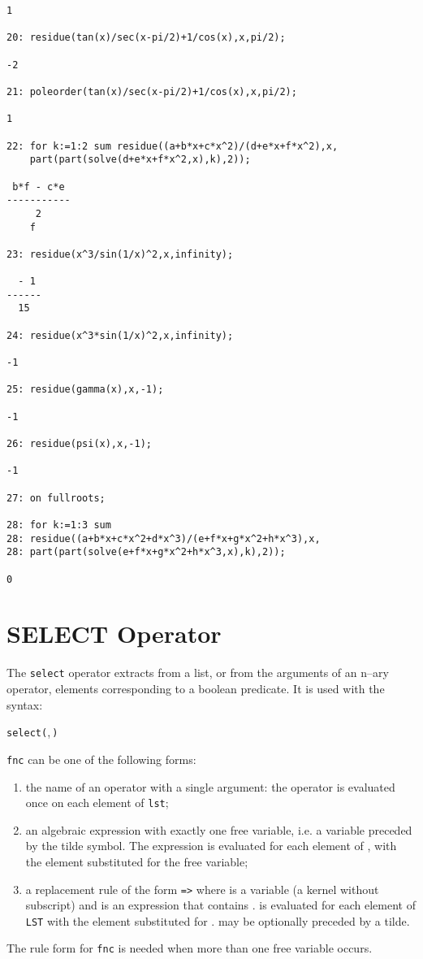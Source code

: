 \begin{small}
\begin{verbatim}
1

20: residue(tan(x)/sec(x-pi/2)+1/cos(x),x,pi/2);

-2

21: poleorder(tan(x)/sec(x-pi/2)+1/cos(x),x,pi/2);

1

22: for k:=1:2 sum residue((a+b*x+c*x^2)/(d+e*x+f*x^2),x,
    part(part(solve(d+e*x+f*x^2,x),k),2));

 b*f - c*e
-----------
     2
    f

23: residue(x^3/sin(1/x)^2,x,infinity);

  - 1
------
  15

24: residue(x^3*sin(1/x)^2,x,infinity);

-1

25: residue(gamma(x),x,-1);

-1

26: residue(psi(x),x,-1);

-1

27: on fullroots;

28: for k:=1:3 sum
28: residue((a+b*x+c*x^2+d*x^3)/(e+f*x+g*x^2+h*x^3),x,
28: part(part(solve(e+f*x+g*x^2+h*x^3,x),k),2));

0
\end{verbatim}
\end{small}

\section{SELECT Operator}
\hypertarget{operator:SELECT}{}

The \texttt{select} operator extracts from a list,
or from the arguments of an n--ary operator, elements corresponding
to a boolean predicate. It is used with the syntax:
\begin{syntax}
  \texttt{select(},\,\texttt{)}
\end{syntax}

\texttt{fnc} can be one of the following forms:
\begin{enumerate}
\item the name of an operator with a single argument: the operator
is evaluated once on each element of \texttt{lst};
\item an algebraic expression with exactly one free variable, i.e.
a variable preceded by the tilde symbol. The expression
is evaluated for each element of , with the element
substituted for the free variable;
\item a replacement rule of the form  \texttt{=>} 
where  is a variable (a kernel without subscript)
and  is an expression that contains .
 is evaluated for each element of \texttt{LST} with
the element substituted for  .  may be
optionally preceded by a tilde.
\end{enumerate}
The rule form  for \texttt{fnc} is needed when more than
one free variable occurs.

